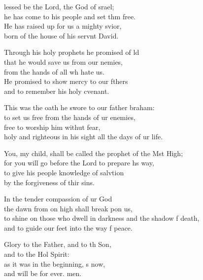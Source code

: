 \settowidth{\versewidth}{to shine on those who dwell in darkness and the shadow of death, *}
\begin{psalmverse}%
  \begin{patverse}
lessed be the Lord, the God of srael;\Med\\
he has come to his people and set thm free.\\
He has raised up for us a mighty svior,\Med\\
born of the house of his servnt David.

Through his holy prophets he promised of ld\Flex\\
that he would save us from our nemies,\Med\\
from the hands of all wh hate us.\\
He promised to show mercy to our fthers\Med\\
and to remember his holy cvenant.

This was the oath he swore to our father braham:\Med\\
to set us free from the hands of ur enemies,\\
free to worship him withut fear,\Med\\
holy and righteous in his sight all the days of ur life.

You, my child, shall be called the prophet of the Mst High;\Med\\
for you will go before the Lord to prepare h\pointup{\i}s way,\\
to give his people knowledge of salvtion\Med\\
by the forgiveness of thir sins.

In the tender compassion of ur God\Med\\
the dawn from on high shall break pon us,\\
to shine on those who dwell in darkness and the shadow f death,\Med\\
and to guide our feet into the way f peace.

Glory to the Father, and to th Son,\Med\\
and to the Hol Spirit:\\
as it was in the beginning, \pointup{\i}s now,\Med\\
and will be for ever. men.
  \end{patverse}
  \end{psalmverse}
